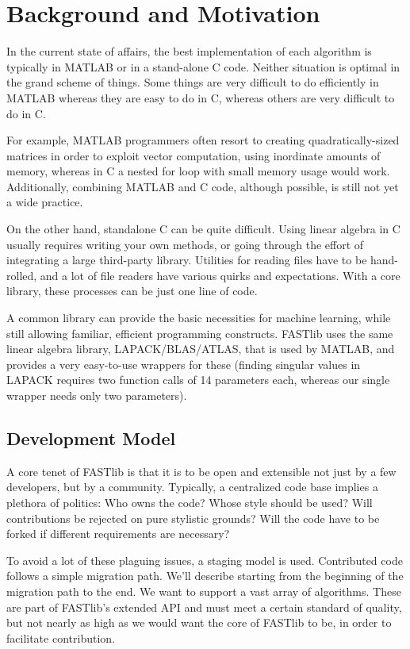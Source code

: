 \documentclass[letter]{report}
\begin{document}
 
\section {Background and Motivation} 
In the current state of affairs, the best implementation of each algorithm is typically in MATLAB or in a stand-alone C code. Neither situation is optimal in the grand scheme of things. Some things are very difficult to do efficiently in MATLAB whereas they are easy to do in C, whereas others are very difficult to do in C. 

For example, MATLAB programmers often resort to creating quadratically-sized matrices in order to exploit vector computation, using inordinate amounts of memory, whereas in C a nested for loop with small memory usage would work. Additionally, combining MATLAB and C code, although possible, is still not yet a wide practice. 

On the other hand, standalone C can be quite difficult. Using linear algebra in C usually requires writing your own methods, or going through the effort of integrating a large third-party library. Utilities for reading files have to be hand-rolled, and a lot of file readers have various quirks and expectations. With a core library, these processes can be just one line of code. 

A common library can provide the basic necessities for machine learning, while still allowing familiar, efficient programming constructs. FASTlib uses the same linear algebra library, LAPACK/BLAS/ATLAS, that is used by MATLAB, and provides a very easy-to-use wrappers for these (finding singular values in LAPACK requires two function calls of 14 parameters each, whereas our single wrapper needs only two parameters). 

\subsection{Development Model} 
A core tenet of FASTlib is that it is to be open and extensible not just by a few developers, but by a community. Typically, a centralized code base implies a plethora of politics: Who owns the code? Whose style should be used? Will contributions be rejected on pure stylistic grounds? Will the code have to be forked if different requirements are necessary? 

To avoid a lot of these plaguing issues, a staging model is used. Contributed code follows a simple migration path. We'll describe starting from the beginning of the migration path to the end. We want to support a vast array of algorithms. These are part of FASTlib's extended API and must meet a certain standard of quality, but not nearly as high as we would want the core of FASTlib to be, in order to facilitate contribution.
\end{document}
